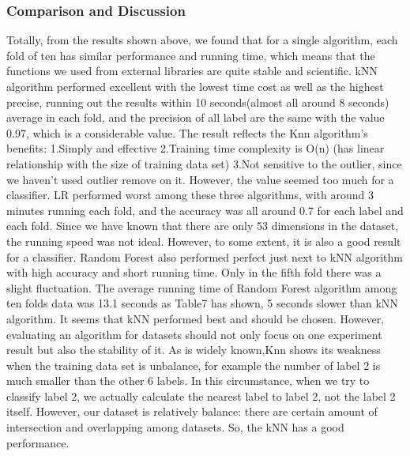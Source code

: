 \documentclass[12pt]{report}
\begin{document}
\subsubsection*{Comparison and Discussion}
Totally, from the results shown above, we found that for a single algorithm, each fold of ten has similar performance and running time, which means that the functions we used from external libraries are quite stable and scientific.
\newline
\newline
kNN algorithm performed excellent with the lowest time cost as well as the highest precise, running out the results within 10 seconds(almost all around 8 seconds) average in each fold, and the precision of all label are the same with the value 0.97, which is a considerable value. The result reflects the Knn algorithm's benefits: 
\newline 1.Simply and effective
\newline 2.Training time complexity is O(n) (has linear relationship with the size of training data set)
\newline 3.Not sensitive to the outlier, since we haven't used outlier remove on it.
\newline However, the value seemed too much for a classifier.
\newline
\newline
LR performed worst among these three algorithms, with around 3 minutes running each fold, and the accuracy was all around 0.7 for each label and each fold. Since we have known that there are only 53 dimensions in the dataset, the running speed was not ideal. However, to some extent, it is also a good result for a classifier.
\newline
\newline
Random Forest also performed perfect just next to kNN algorithm with high accuracy and short running time. Only in the fifth fold there was a slight fluctuation. The average running time of Random Forest algorithm among ten folds data was 13.1 seconds as Table7 has shown, 5 seconds slower than kNN algorithm.
\newline
\newline
It seems that kNN performed best and should be chosen. However, evaluating an algorithm for datasets should not only focus on one experiment result but also the stability of it.
\newline
\newline As is widely known,Knn shows its weakness when the training data set is unbalance, for example the number of label 2 is much smaller than the other 6 labels. In this circumstance, when we try to classify label 2, we actually calculate the nearest label to label 2, not the label 2 itself. However, our dataset is relatively balance: there are certain amount of intersection and overlapping among datasets. So, the kNN has a good performance. 
\end{document}
